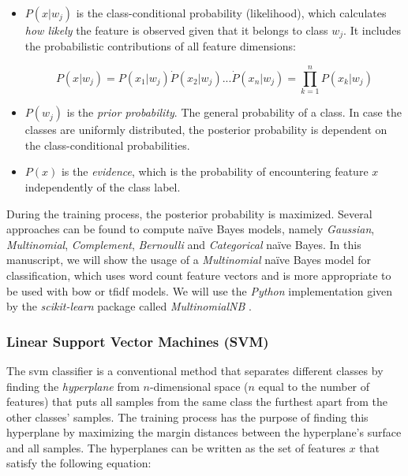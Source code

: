 \begin{itemize}
\item $P(x|w_j)$ is the class-conditional probability (likelihood), which calculates \textit{how likely} the feature is observed given that it belongs to class $w_j$. It includes the probabilistic contributions of all feature dimensions:

\begin{equation}
P(x|w_j) = P(x_1|w_j) \dot P(x_2|w_j) ... \dot P(x_n|w_j) = \prod^n_{k=1}P(x_k|w_j)
\end{equation}

\item $P(w_j)$ is the \textit{prior probability}. The general probability of a class. In case the classes are uniformly distributed, the posterior probability is dependent on the class-conditional probabilities.
\item $P(x)$ is the \textit{evidence}, which is the probability of encountering feature $x$ independently of the class label.
\end{itemize}

During the training process, the posterior probability is maximized. Several approaches can be found to compute naïve Bayes models, namely \textit{Gaussian}, \textit{Multinomial}, \textit{Complement}, \textit{Bernoulli} and \textit{Categorical} naïve Bayes. In this manuscript, we will show the usage of a \textit{Multinomial} naïve Bayes model for classification, which uses word count feature vectors and is more appropriate to be used with \gls{bow} or \gls{tfidf} models. We will use the \textit{Python} implementation given by the \textit{scikit-learn} package called \textit{MultinomialNB} \cite{scikit-learn}.

\subsubsection{Linear Support Vector Machines (SVM)}
\label{subsec:svm}

The \gls{svm} classifier is a conventional method that separates different classes by finding the \textit{hyperplane} from $n$-dimensional space ($n$ equal to the number of features) that puts all samples from the same class the furthest apart from the other classes' samples. The training process has the purpose of finding this hyperplane by maximizing the margin distances between the hyperplane's surface and all samples. The hyperplanes can be written as the set of features $x$ that satisfy the following equation: 

